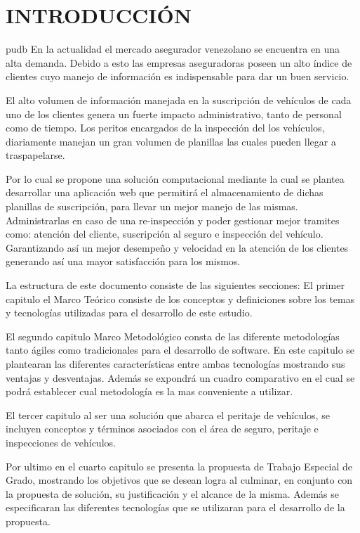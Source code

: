 \chapter*{INTRODUCCIÓN}


\setlength{\parskip}{4mm}
pudb
En la actualidad el mercado asegurador venezolano se encuentra en una alta demanda. Debido a esto las empresas aseguradoras poseen un alto índice de clientes cuyo manejo de información es indispensable para dar un buen servicio.

El alto volumen de información manejada en la suscripción de vehículos de cada uno de los clientes genera un fuerte impacto administrativo, tanto de personal como de tiempo. Los peritos encargados de la inspección del los vehículos, diariamente manejan un gran volumen de planillas las cuales pueden llegar a traspapelarse.

Por lo cual se propone una solución computacional mediante la cual se plantea desarrollar una aplicación web que permitirá el almacenamiento de dichas planillas de suscripción, para llevar un mejor manejo de las mismas. Administrarlas en caso de una re-inspección y poder gestionar mejor tramites como: atención del cliente, suscripción al seguro e inspección del vehículo. Garantizando así un mejor desempeño y velocidad en la atención de los clientes generando así una mayor satisfacción para los mismos.

La estructura de este documento consiste de las siguientes secciones: El primer capitulo el Marco Teórico consiste de los conceptos y definiciones sobre los temas y tecnologías utilizadas para el desarrollo de este estudio. 

El segundo capitulo Marco Metodológico consta de las diferente metodologías tanto ágiles como tradicionales para el desarrollo de software. En este capitulo se plantearan las diferentes características entre ambas tecnologías mostrando sus ventajas y desventajas. Además se expondrá un cuadro comparativo en el cual se podrá establecer cual metodología es la mas conveniente a utilizar.

El tercer capitulo al ser una solución que abarca el peritaje de vehículos, se incluyen conceptos y términos asociados con el área de seguro, peritaje e inspecciones de vehículos.

Por ultimo en el cuarto capitulo se presenta la propuesta de Trabajo Especial de Grado, mostrando los objetivos que se desean logra al culminar, en conjunto con la propuesta de solución, su justificación y el alcance de la misma. Además se especificaran las diferentes tecnologías que se utilizaran para el desarrollo de la propuesta.
\setlength{\parskip}{0mm}